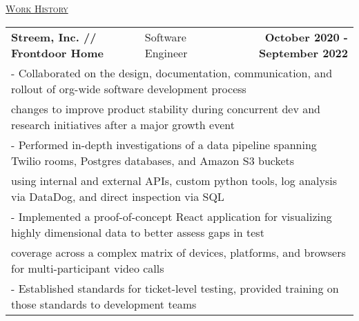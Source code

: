 \documentclass[letterpaper]{article}
\begin{document}
	\begin{center}
		\vspace{0.0in}
		\underline{\large \scshape Work History}
		\begin{tabular}{p{}p{}r}
			\\
				\textbf{Streem, Inc. // Frontdoor Home} &
				\quad\quad\quad\quad\quad\quad Software Engineer &
				\textbf{October 2020 - September 2022\quad}
			\\
				\multicolumn{3}{p{\textwidth}}{\quad\quad - Collaborated on the design, documentation, communication, and rollout of org-wide software development process}
			\\
				\multicolumn{3}{p{\textwidth}}{\quad\quad\quad changes to improve product stability during concurrent dev and research initiatives after a major growth event} 
			\\
				\multicolumn{3}{p{\textwidth}}{\quad\quad - Performed in-depth investigations of a data pipeline spanning Twilio rooms, Postgres databases, and Amazon S3 buckets}  
			\\
				\multicolumn{3}{p{\textwidth}}{\quad\quad\quad using internal and external APIs, custom python tools, log analysis via DataDog, and direct inspection via SQL}
			\\
			    \multicolumn{3}{p{\textwidth}}{\quad\quad - Implemented a proof-of-concept React application for visualizing highly dimensional data to better assess gaps in test}
			\\
				\multicolumn{3}{p{\textwidth}}{\quad\quad\quad  coverage across a complex matrix of devices, platforms, and browsers for multi-participant video calls }
			\\
				\multicolumn{3}{p{\textwidth}}{\quad\quad - Established standards for ticket-level testing, provided training on those standards to development teams}
			\\

\end{tabular}
\end{center}
\end{document}
